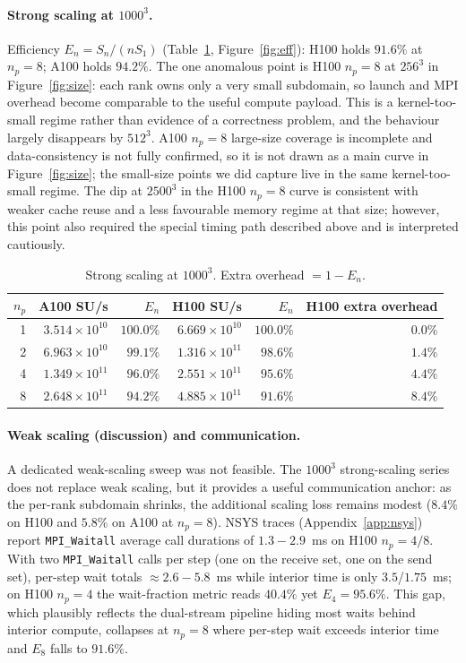 \documentclass[10pt,a4paper]{article}
\begin{document}
\paragraph{Strong scaling at $1000^3$.}
Efficiency $E_n{=}S_n/(n S_1)$ (Table~\ref{tab:scale}, Figure~\ref{fig:eff}): H100 holds $91.6\%$ at $n_p{=}8$; A100 holds $94.2\%$. The one anomalous point is H100 $n_p{=}8$ at $256^3$ in Figure~\ref{fig:size}: each rank owns only a very small subdomain, so launch and MPI overhead become comparable to the useful compute payload. This is a kernel-too-small regime rather than evidence of a correctness problem, and the behaviour largely disappears by $512^3$. A100 $n_p{=}8$ large-size coverage is incomplete and data-consistency is not fully confirmed, so it is not drawn as a main curve in Figure~\ref{fig:size}; the small-size points we did capture live in the same kernel-too-small regime. The dip at $2500^3$ in the H100 $n_p{=}8$ curve is consistent with weaker cache reuse and a less favourable memory regime at that size; however, this point also required the special timing path described above and is interpreted cautiously.

\begin{table}[h]
\centering\small
\caption{Strong scaling at $1000^3$. Extra overhead $=1-E_n$.}
\label{tab:scale}
\begin{tabular}{@{}rrrrrr@{}}
\toprule
$n_p$ & A100 SU/s & $E_n$ & H100 SU/s & $E_n$ & H100 extra overhead \\
\midrule
1 & $3.514\!\times\!10^{10}$ & $100.0\%$ & $6.669\!\times\!10^{10}$ & $100.0\%$ & $0.0\%$ \\
2 & $6.963\!\times\!10^{10}$ & $99.1\%$  & $1.316\!\times\!10^{11}$ & $98.6\%$  & $1.4\%$ \\
4 & $1.349\!\times\!10^{11}$ & $96.0\%$  & $2.551\!\times\!10^{11}$ & $95.6\%$  & $4.4\%$ \\
8 & $2.648\!\times\!10^{11}$ & $94.2\%$  & $4.885\!\times\!10^{11}$ & $91.6\%$  & $8.4\%$ \\
\bottomrule
\end{tabular}
\end{table}

\paragraph{Weak scaling (discussion) and communication.}
A dedicated weak-scaling sweep was not feasible. The $1000^3$ strong-scaling series does not replace weak scaling, but it provides a useful communication anchor: as the per-rank subdomain shrinks, the additional scaling loss remains modest ($8.4\%$ on H100 and $5.8\%$ on A100 at $n_p{=}8$). NSYS traces (Appendix~\ref{app:nsys}) report \texttt{MPI\_Waitall} average call durations of $1.3\!-\!2.9$~ms on H100 $n_p{=}4/8$. With two \texttt{MPI\_Waitall} calls per step (one on the receive set, one on the send set), per-step wait totals $\approx\!2.6\!-\!5.8$~ms while interior time is only $3.5$/$1.75$~ms; on H100 $n_p{=}4$ the wait-fraction metric reads $40.4\%$ yet $E_4{=}95.6\%$. This gap, which plausibly reflects the dual-stream pipeline hiding most waits behind interior compute, collapses at $n_p{=}8$ where per-step wait exceeds interior time and $E_8$ falls to $91.6\%$.
\end{document}
